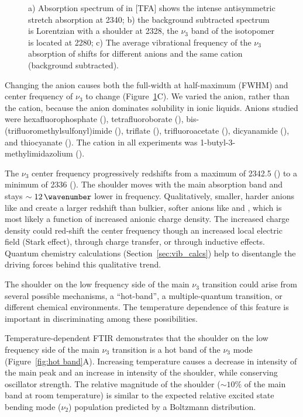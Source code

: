 {\begin{figure}
  \caption[FTIR of carbon dioxide in ionic liquids]{\label{fig:FTIR} a) Absorption spectrum of  in \ce{[Im_{4,1}]}[TFA] shows the intense antisymmetric stretch absorption at \SI{2340}{\wavenumber}; b) the background subtracted spectrum is Lorentzian with a shoulder at \SI{2328}{\wavenumber}, the \(\nu_3\) band of the  isotopomer is located at \SI{2280}{\wavenumber}; c) The average vibrational frequency of the \(\nu_3\) absorption of  shifts for different anions and the same \ce{[Im_{4,1}^+]} cation (background subtracted).}
\end{figure}

Changing the anion causes both the full-width at half-maximum (FWHM) and center frequency of \(\nu_3\) to change (Figure~\ref{fig:FTIR}C). We varied the anion, rather than the cation, because the anion dominates  solubility in ionic liquids.\cite{anthonyJPCB-05,Cadena2004,Bhargava2007} Anions studied were hexafluorophosphate (), tetrafluoroborate (), bis-(trifluoromethyl\-sulfonyl)imide (), triflate (), trifluoroacetate (), dicyanamide (), and thiocyanate (). The cation in all experiments was 1-butyl-3-methylimidazolium (\ce{[Im_{4,1}]}).

The \(\nu_3\) center frequency progressively redshifts from a maximum of \SI{2342.5}{\wavenumber} (\ce{[PF6-]}) to a minimum of \SI{2336}{\wavenumber} (\ce{[SCN]-}). The shoulder moves with the main absorption band and stays \(\sim\SI{12}{\wavenumber}\) lower in frequency.  Qualitatively, smaller, harder anions like \ce{[SCN]-} and \ce{[DCA]-} create a larger redshift than bulkier, softer anions like \ce{[Tf2N]-} and \ce{[TfO]-}, which is most likely a function of increased anionic charge density. The increased charge density could red-shift the  center frequency though an increased local electric field (Stark effect), through charge transfer, or through inductive effects. Quantum chemistry calculations (Section~\ref{sec:vib_calcs}) help to disentangle the driving forces behind this qualitative trend.

The shoulder on the low frequency side of the main \(\nu_3\) transition could arise from several possible mechanisms, a ``hot-band'', a multiple-quantum transition, or different chemical environments. The temperature dependence of this feature is important in discriminating among these possibilities.

Temperature-dependent FTIR demonstrates that the shoulder on the low frequency side of the main \(\nu_3\) transition  is a hot band of the \(\nu_3\) mode (Figure~\ref{fig:hot band}A). Increasing temperature causes a decrease in intensity of the main peak and an increase in intensity of the shoulder, while conserving oscillator strength. The relative magnitude of the shoulder (\(\sim 10\%\) of the main band at room temperature) is similar to the expected relative excited state bending mode (\(\nu_2\)) population predicted by a Boltzmann distribution.

}
